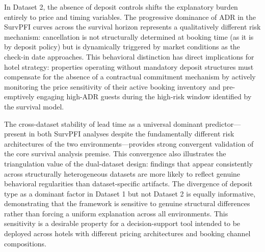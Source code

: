 \documentclass[pdflatex,sn-mathphys-ay]{sn-jnl}
\theoremstyle{thmstyleone}%
\theoremstyle{thmstyletwo}%
\theoremstyle{thmstylethree}%
\begin{document}
In Dataset 2, the absence of deposit controls shifts the explanatory burden entirely to price and timing variables. The progressive dominance of ADR in the SurvPFI curves across the survival horizon represents a qualitatively different risk mechanism: cancellation is not structurally determined at booking time (as it is by deposit policy) but is dynamically triggered by market conditions as the check-in date approaches. This behavioral distinction has direct implications for hotel strategy: properties operating without mandatory deposit structures must compensate for the absence of a contractual commitment mechanism by actively monitoring the price sensitivity of their active booking inventory and pre-emptively engaging high-ADR guests during the high-risk window identified by the survival model.

The cross-dataset stability of lead time as a universal dominant predictor—present in both SurvPFI analyses despite the fundamentally different risk architectures of the two environments—provides strong convergent validation of the core survival analysis premise. This convergence also illustrates the triangulation value of the dual-dataset design: findings that appear consistently across structurally heterogeneous datasets are more likely to reflect genuine behavioral regularities than dataset-specific artifacts. The divergence of deposit type as a dominant factor in Dataset 1 but not Dataset 2 is equally informative, demonstrating that the framework is sensitive to genuine structural differences rather than forcing a uniform explanation across all environments. This sensitivity is a desirable property for a decision-support tool intended to be deployed across hotels with different pricing architectures and booking channel compositions.
\end{document}
